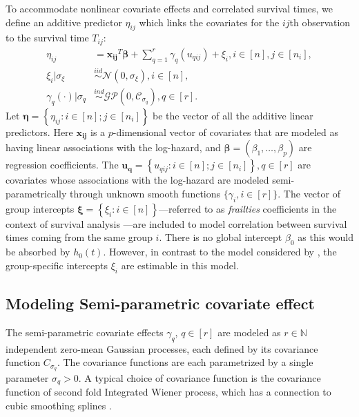 \documentclass[ba]{imsart}
\begin{document}
To accommodate nonlinear covariate effects and correlated survival times, we define an additive predictor $\eta_{ij}$ which links the covariates for the $ij$th observation to the survival time $T_{ij}$:
\begin{equation}\begin{aligned}\label{eqn:eta}
\eta_{ij} &=\boldsymbol{x_{ij}}^{T}\boldsymbol{\beta}+\sum_{q=1}^{r} \gamma_q(u_{qij}) +\xi_{i} , i\in[n],j\in[n_{i}], \\
\xi_i | \sigma_{\xi} &\overset{iid}{\sim} \mathcal{N}(0,\sigma_{\xi}) , i\in[n], \\
\gamma_{q}(\cdot)|\sigma_{q} &\overset{ind}{\sim} \mathcal{GP}\left(0,\mathcal{C}_{\sigma_q}\right), q\in[r].
\end{aligned}\end{equation}
Let $ \boldsymbol{\eta} = \left\{ \eta_{ij}: i \in [n]; j\in[n_{i}] \right\}$ be the vector of all the additive linear predictors. Here $\boldsymbol{x_{ij}}$ is a $p$-dimensional vector of covariates that are modeled as having linear associations with the log-hazard, and $\boldsymbol{\beta} = (\beta_{1},\ldots,\beta_{p})$ are regression coefficients. The $\boldsymbol{u_{q}} = \left\{u_{qij}: i \in [n]; j \in[n_{i}] \right\}, q \in [r]$ are covariates whose associations with the log-hazard are modeled semi-parametrically through unknown smooth functions $\{\gamma_i, i \in [r]\}$. The vector of group intercepts $\boldsymbol{\xi} = \left\{ \xi_{i}: i \in [n] \right\}$---referred to as \textit{frailties} coefficients in the context of survival analysis \citep{frailty}---are included to model correlation between survival times coming from the same group $i$. There is no global intercept $\beta_{0}$ as this would be absorbed by $h_{0}(t)$. However, in contrast to the model considered by \cite{casecross}, the group-specific intercepts $\xi_{i}$ are estimable in this model.

\subsection{Modeling Semi-parametric covariate effect}\label{subsec:smooth}

The semi-parametric covariate effects $\gamma_q$, $q \in [r]$ are modeled as $r\in\mathbb{N}$ independent zero-mean Gaussian processes, each defined by its covariance function $C_{\sigma_{q}}$. The covariance functions are each parametrized by a single parameter $\sigma_q > 0$. A typical choice of covariance function is the covariance function of second fold Integrated Wiener process\citep{wiener}, which has a connection to cubic smoothing splines \citep{wahbaprior}.
\end{document}
